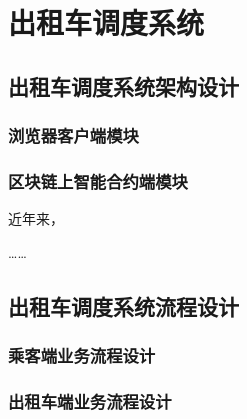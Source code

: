 \chapter{出租车调度系统}
\label{chap:intro}
\section{出租车调度系统架构设计}
\subsection{浏览器客户端模块}
\subsection{区块链上智能合约端模块}
近年来，

……

\section{出租车调度系统流程设计}
\subsection{乘客端业务流程设计}
\subsection{出租车端业务流程设计}